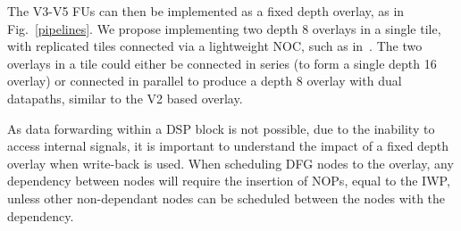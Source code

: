 The V3-V5 FUs can then be implemented as a fixed depth overlay, as in Fig.~\ref{pipelines}. We propose implementing two depth 8 overlays in a single tile, with replicated tiles connected via a lightweight NOC, such as in~\cite{kapre2015hoplite}. The two overlays in a tile could either be connected in series (to form a single depth 16 overlay) or connected in parallel to produce a depth 8 overlay with dual datapaths, similar to the V2 based overlay. 

As data forwarding within a DSP block is not possible, due to the inability to access internal signals, it is important to understand the impact of a fixed depth overlay when write-back is used. 
When scheduling DFG nodes to the overlay, any dependency between nodes will require the insertion of NOPs, equal to the IWP, unless other non-dependant nodes can be scheduled between the nodes with the dependency.


